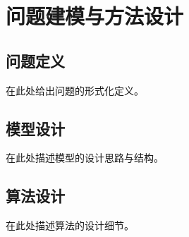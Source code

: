 
\chapter{问题建模与方法设计}

\section{问题定义}

在此处给出问题的形式化定义。

\section{模型设计}

在此处描述模型的设计思路与结构。

\section{算法设计}

在此处描述算法的设计细节。
